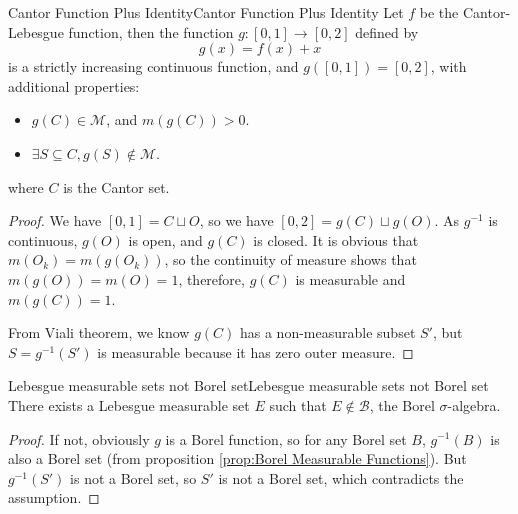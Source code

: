 \documentclass[../main.tex]{subfiles}
\begin{document}
\begin{proposition}{Cantor Function Plus Identity}{Cantor Function Plus Identity}
	Let $f$ be the Cantor-Lebesgue function, then the function $g: [0,1] \rightarrow [0,2]$ defined by
	\begin{equation*}
		g(x) = f(x) + x
	\end{equation*}
	is a strictly increasing continuous function, and $g([0,1]) = [0,2]$, with additional properties:
	\begin{itemize}
		\item $g(C)\in \mathcal{M}$, and $m(g(C)) > 0$.
		\item $\exists S \subseteq C, g(S)\notin \mathcal{M}$.
	\end{itemize}
	where $C$ is the Cantor set.
\end{proposition}
\begin{proof}
	We have $[0,1] = C \sqcup O$, so we have $[0,2] = g(C) \sqcup g(O)$. As $g^{-1}$ is continuous, $g(O)$ is open, and $g(C)$ is closed. It is obvious that $m(O_k) = m(g(O_k))$, so the continuity of measure shows that $m(g(O)) = m(O) = 1$, therefore, $g(C)$ is measurable and $m(g(C)) = 1$.

	From Viali theorem, we know $g(C)$ has a non-measurable subset $S'$, but $S=g^{-1}(S')$ is measurable because it has zero outer measure.
\end{proof}

\begin{corollary}{Lebesgue measurable sets not Borel set}{Lebesgue measurable sets not Borel set}
	There exists a Lebesgue measurable set $E$ such that $E\notin \mathcal{B}$, the Borel $\sigma$-algebra.
\end{corollary}
\begin{proof}
	If not, obviously $g$ is a Borel function, so for any Borel set $B$, $g^{-1}(B)$ is also a Borel set (from proposition \ref{prop:Borel Measurable Functions}). But $g^{-1}(S')$ is not a Borel set, so $S'$ is not a Borel set, which contradicts the assumption.
\end{proof}
\end{document}
